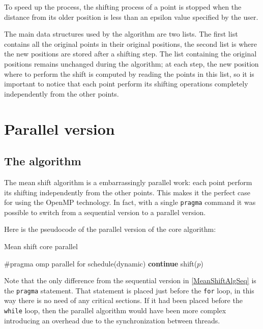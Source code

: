 \documentclass[10pt,twocolumn,letterpaper]{article}
\begin{document}
To speed up the process, the shifting process of a point is stopped when the distance from its older position is less than an epsilon value specified by the user.

The main data structures used by the algorithm are two lists. The first list contains all the original points in their original positions, the second list is where the new positions are stored after a shifting step. The list containing the original positions remains unchanged during the algorithm; at each step, the new position where to perform the shift is computed by reading the points in this list, so it is important to notice that each point perform its shifting operations completely independently from the other points. 

\section{Parallel version}

\subsection{The algorithm}

The mean shift algorithm is a embarrassingly parallel work: each point perform its shifting independently from the other points. This makes it the perfect case for using the OpenMP technology. In fact, with a single \verb"pragma" command it was possible to switch from a sequential version to a parallel version.

Here is the pseudocode of the parallel version of the core algorithm:

\begin{algorithm}
\label{MeanShiftAlgPar}
\caption{Mean shift core parallel}
\begin{algorithmic}

		\State \#pragma omp parallel for schedule(dynamic)
    				\State \textbf{continue}
    			\EndIf
    		\State shift($p$)
    		\EndFor
    \EndWhile

\end{algorithmic}
\end{algorithm}

Note that the only difference from the sequential version in \ref{MeanShiftAlgSeq} is the \verb"pragma" statement. That statement is placed just before the \verb"for" loop, in this way there is no need of any critical sections. If it had been placed before the \verb"while" loop, then the parallel algorithm would have been more complex introducing an overhead due to the synchronization between threads.
\end{document}
